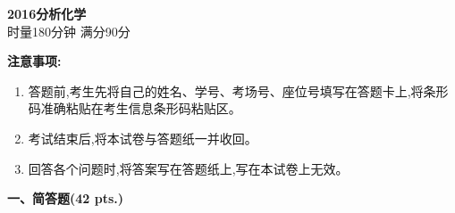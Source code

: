 \begin{center}
    {\LARGE \textbf{2016分析化学}} \\[2ex]
    {\large 时量180分钟 \quad 满分90分}
\end{center}

\vspace{0.5cm}
\noindent\textbf{注意事项:}
\begin{enumerate}[label=\arabic*., parsep=0pt, itemsep=0pt]
    \item 答题前,考生先将自己的姓名、学号、考场号、座位号填写在答题卡上,将条形码准确粘贴在考生信息条形码粘贴区。
    \item 考试结束后,将本试卷与答题纸一并收回。
    \item 回答各个问题时,将答案写在答题纸上,写在本试卷上无效。
\end{enumerate}

\vspace{0.5cm}
\noindent\textbf{一、简答题(42 pts.)}

